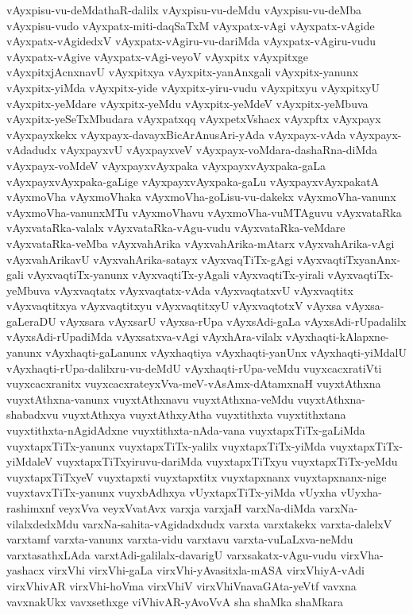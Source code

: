 {vAyxpisu-vu-deMdathaR-dalilx
vAyxpisu-vu-deMdu
vAyxpisu-vu-deMba
vAyxpisu-vudo
vAyxpatx-miti-daqSaTxM
vAyxpatx-vAgi
vAyxpatx-vAgide
vAyxpatx-vAgidedxV
vAyxpatx-vAgiru-vu-dariMda
vAyxpatx-vAgiru-vudu
vAyxpatx-vAgive
vAyxpatx-vAgi-veyoV
vAyxpitx
vAyxpitxge
vAyxpitxjAcnxnavU
vAyxpitxya
vAyxpitx-yanAnxgali
vAyxpitx-yanunx
vAyxpitx-yiMda
vAyxpitx-yide
vAyxpitx-yiru-vudu
vAyxpitxyu
vAyxpitxyU
vAyxpitx-yeMdare
vAyxpitx-yeMdu
vAyxpitx-yeMdeV
vAyxpitx-yeMbuva
vAyxpitx-yeSeTxMbudara
vAyxpatxqq
vAyxpetxVshacx
vAyxpftx
vAyxpayx
vAyxpayxkekx
vAyxpayx-davayxBicArAnusAri-yAda
vAyxpayx-vAda
vAyxpayx-vAdadudx
vAyxpayxvU
vAyxpayxveV
vAyxpayx-voMdara-dashaRna-diMda
vAyxpayx-voMdeV
vAyxpayxvAyxpaka
vAyxpayxvAyxpaka-gaLa
vAyxpayxvAyxpaka-gaLige
vAyxpayxvAyxpaka-gaLu
vAyxpayxvAyxpakatA
vAyxmoVha
vAyxmoVhaka
vAyxmoVha-goLisu-vu-dakekx
vAyxmoVha-vanunx
vAyxmoVha-vanunxMTu
vAyxmoVhavu
vAyxmoVha-vuMTAguvu
vAyxvataRka
vAyxvataRka-valalx
vAyxvataRka-vAgu-vudu
vAyxvataRka-veMdare
vAyxvataRka-veMba
vAyxvahArika
vAyxvahArika-mAtarx
vAyxvahArika-vAgi
vAyxvahArikavU
vAyxvahArika-satayx
vAyxvaqTiTx-gAgi
vAyxvaqtiTxyanAnx-gali
vAyxvaqtiTx-yanunx
vAyxvaqtiTx-yAgali
vAyxvaqtiTx-yirali
vAyxvaqtiTx-yeMbuva
vAyxvaqtatx
vAyxvaqtatx-vAda
vAyxvaqtatxvU
vAyxvaqtitx
vAyxvaqtitxya
vAyxvaqtitxyu
vAyxvaqtitxyU
vAyxvaqtotxV
vAyxsa
vAyxsa-gaLeraDU
vAyxsara
vAyxsarU
vAyxsa-rUpa
vAyxsAdi-gaLa
vAyxsAdi-rUpadalilx
vAyxsAdi-rUpadiMda
vAyxsatxva-vAgi
vAyxhAra-vilalx
vAyxhaqti-kAlapxne-yanunx
vAyxhaqti-gaLanunx
vAyxhaqtiya
vAyxhaqti-yanUnx
vAyxhaqti-yiMdalU
vAyxhaqti-rUpa-dalilxru-vu-deMdU
vAyxhaqti-rUpa-veMdu
vuyxcacxratiVti
vuyxcacxranitx
vuyxcacxrateyxVva-meV-vAsAmx-dAtamxnaH
vuyxtAthxna
vuyxtAthxna-vanunx
vuyxtAthxnavu
vuyxtAthxna-veMdu
vuyxtAthxna-shabadxvu
vuyxtAthxya
vuyxtAthxyAtha
vuyxtithxta
vuyxtithxtana
vuyxtithxta-nAgidAdxne
vuyxtithxta-nAda-vana
vuyxtapxTiTx-gaLiMda
vuyxtapxTiTx-yanunx
vuyxtapxTiTx-yalilx
vuyxtapxTiTx-yiMda
vuyxtapxTiTx-yiMdaleV
vuyxtapxTiTxyiruvu-dariMda
vuyxtapxTiTxyu
vuyxtapxTiTx-yeMdu
vuyxtapxTiTxyeV
vuyxtapxti
vuyxtapxtitx
vuyxtapxnanx
vuyxtapxnanx-nige
vuyxtavxTiTx-yanunx
vuyxbAdhxya
vUyxtapxTiTx-yiMda
vUyxha
vUyxha-rashimxnf
veyxVva
veyxVvatAvx
varxja
varxjaH
varxNa-diMda
varxNa-vilalxdedxMdu
varxNa-sahita-vAgidadxdudx
varxta
varxtakekx
varxta-dalelxV
varxtamf
varxta-vanunx
varxta-vidu
varxtavu
varxta-vuLaLxva-neMdu
varxtasathxLAda
varxtAdi-galilalx-davarigU
varxsakatx-vAgu-vudu
virxVha-yashacx
virxVhi
virxVhi-gaLa
virxVhi-yAvasitxla-mASA
virxVhiyA-vAdi
virxVhivAR
virxVhi-hoVma
virxVhiV
virxVhiVnavaGAta-yeVtf
vavxna
vavxnakUkx
vavxsethxge
viVhivAR-yAvoVvA
sha
shaMka
shaMkara
}
